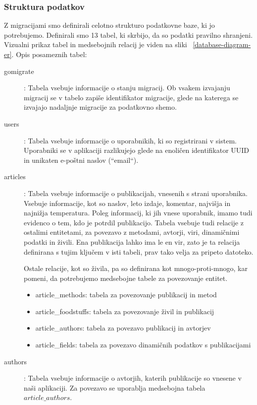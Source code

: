 \documentclass[a4paper, 12pt]{book}
\begin{document}
\subsubsection{ Struktura podatkov }
Z migracijami smo definirali celotno strukturo podatkovne baze, ki jo potrebujemo. Definirali smo 13 tabel, ki skrbijo, da so podatki pravilno shranjeni. Vizualni prikaz tabel in medsebojnih relacij je viden na sliki ~\ref{database-diagram-er}. Opis posameznih tabel:
\begin{description}
\item[gomigrate]: Tabela vsebuje informacije o stanju migracij. Ob vsakem izvajanju migracij se v tabelo zapiše identifikator migracije, glede na katerega se izvajajo nadaljnje migracije za podatkovno shemo.

\item[users]: Tabela vsebuje informacije o uporabnikih, ki so registrirani v sistem. Uporabniki se v aplikaciji razlikujejo glede na enoličen identifikator UUID in unikaten e-poštni naslov (``email``).

\item[articles]: Tabela vsebuje informacije o publikacijah, vnesenih s strani uporabnika. Vsebuje informacije, kot so naslov, leto izdaje, komentar, najvišja in najnižja temperatura. Poleg informacij, ki jih vnese uporabnik, imamo tudi evidenco o tem, kdo je potrdil publikacijo. Tabela vsebuje tudi relacije z ostalimi entitetami, za povezavo z metodami, avtorji, viri, dinamičnimi podatki in živili. Ena publikacija lahko ima le en vir, zato je ta relacija definirana s tujim ključem v isti tabeli, prav tako velja za pripeto datoteko.

Ostale relacije, kot so živila, pa so definirana kot mnogo-proti-mnogo, kar pomeni, da potrebujemo medsebojne tabele za povezovanje entitet.
\begin{itemize}
\item article\_methods: tabela za povezovanje publikacij in metod
\item article\_foodstuffs: tabela za povezovanje živil in publikacij
\item article\_authors: tabela za povezavo publikacij in avtorjev
\item article\_fields: tabela za povezavo dinamičnih podatkov s publikacijami
\end{itemize}

\item[authors]: Tabela vsebuje informacije o avtorjih, katerih publikacije so vnesene v naši aplikaciji. Za povezavo se uporablja medsebojna tabela $article\_authors$.


\end{description}
\end{document}
